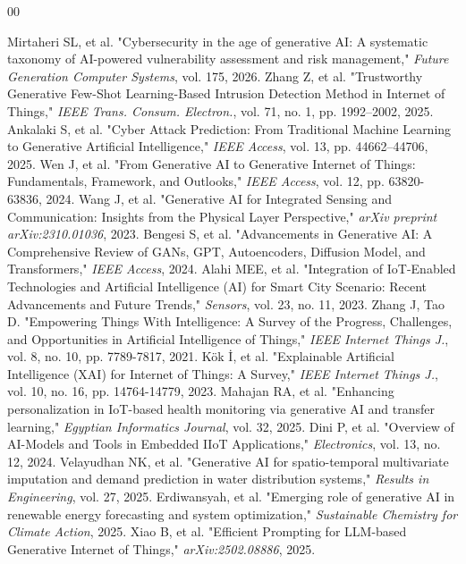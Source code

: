 \documentclass[journal]{IEEEtran}
\begin{document}
\begin{thebibliography}{00}

 Mirtaheri SL, et al. "Cybersecurity in the age of generative AI: A systematic taxonomy of AI-powered vulnerability assessment and risk management," \textit{Future Generation Computer Systems}, vol. 175, 2026.
 Zhang Z, et al. "Trustworthy Generative Few-Shot Learning-Based Intrusion Detection Method in Internet of Things," \textit{IEEE Trans. Consum. Electron.}, vol. 71, no. 1, pp. 1992–2002, 2025.
 Ankalaki S, et al. "Cyber Attack Prediction: From Traditional Machine Learning to Generative Artificial Intelligence," \textit{IEEE Access}, vol. 13, pp. 44662–44706, 2025.
 Wen J, et al. "From Generative AI to Generative Internet of Things: Fundamentals, Framework, and Outlooks," \textit{IEEE Access}, vol. 12, pp. 63820-63836, 2024.
 Wang J, et al. "Generative AI for Integrated Sensing and Communication: Insights from the Physical Layer Perspective," \textit{arXiv preprint arXiv:2310.01036}, 2023.
 Bengesi S, et al. "Advancements in Generative AI: A Comprehensive Review of GANs, GPT, Autoencoders, Diffusion Model, and Transformers," \textit{IEEE Access}, 2024.
 Alahi MEE, et al. "Integration of IoT-Enabled Technologies and Artificial Intelligence (AI) for Smart City Scenario: Recent Advancements and Future Trends," \textit{Sensors}, vol. 23, no. 11, 2023.
 Zhang J, Tao D. "Empowering Things With Intelligence: A Survey of the Progress, Challenges, and Opportunities in Artificial Intelligence of Things," \textit{IEEE Internet Things J.}, vol. 8, no. 10, pp. 7789-7817, 2021.
 Kök İ, et al. "Explainable Artificial Intelligence (XAI) for Internet of Things: A Survey," \textit{IEEE Internet Things J.}, vol. 10, no. 16, pp. 14764-14779, 2023.
 Mahajan RA, et al. "Enhancing personalization in IoT-based health monitoring via generative AI and transfer learning," \textit{Egyptian Informatics Journal}, vol. 32, 2025.
 Dini P, et al. "Overview of AI-Models and Tools in Embedded IIoT Applications," \textit{Electronics}, vol. 13, no. 12, 2024.
 Velayudhan NK, et al. "Generative AI for spatio-temporal multivariate imputation and demand prediction in water distribution systems," \textit{Results in Engineering}, vol. 27, 2025.
 Erdiwansyah, et al. "Emerging role of generative AI in renewable energy forecasting and system optimization," \textit{Sustainable Chemistry for Climate Action}, 2025.
 Xiao B, et al. "Efficient Prompting for LLM-based Generative Internet of Things," \textit{arXiv:2502.08886}, 2025.

\end{thebibliography}
\end{document}

